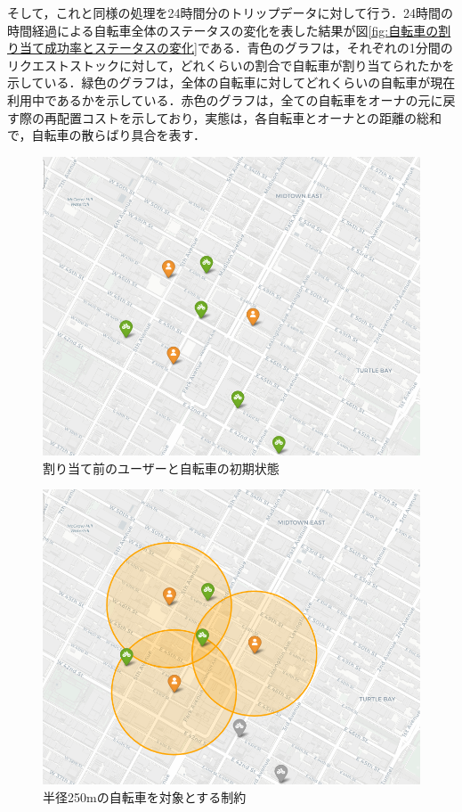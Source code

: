           \par そして，これと同様の処理を24時間分のトリップデータに対して行う．24時間の時間経過による自転車全体のステータスの変化を表した結果が図\ref{fig:自転車の割り当て成功率とステータスの変化}である．青色のグラフは，それぞれの1分間のリクエストストックに対して，どれくらいの割合で自転車が割り当てられたかを示している．緑色のグラフは，全体の自転車に対してどれくらいの自転車が現在利用中であるかを示している．赤色のグラフは，全ての自転車をオーナの元に戻す際の再配置コストを示しており，実態は，各自転車とオーナとの距離の総和で，自転車の散らばり具合を表す．

          \begin{figure}[htbp]
            \centering
            \includegraphics[scale=0.35]
            {figures/simulation1.png}
            \caption{割り当て前のユーザーと自転車の初期状態}
            \label{fig:割り当て前のユーザーと自転車の初期状態}
          \end{figure}

          \begin{figure}[htbp]
            \centering
            \includegraphics[scale=0.35]
            {figures/simulation2.png}
            \caption{半径250mの自転車を対象とする制約}
            \label{fig:半径250mの自転車を対象とする制約}
          \end{figure}

